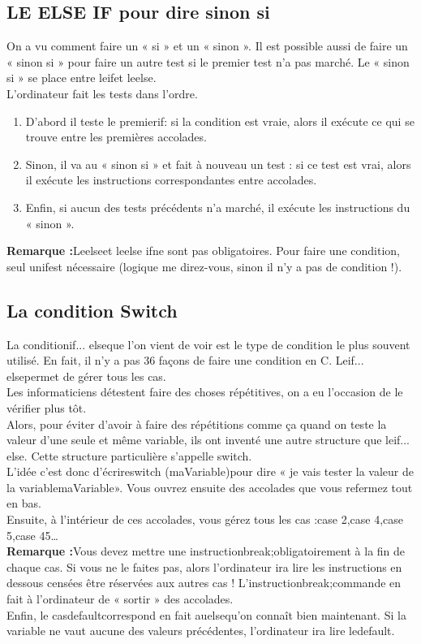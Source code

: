 \subsection{LE ELSE IF pour dire sinon si}
On a vu comment faire un « si » et un « sinon ». Il est possible aussi de faire un « sinon si » pour faire un autre test si le premier test n'a pas marché. Le « sinon si » se place entre leifet leelse.
\\[0.5cm]
L'ordinateur fait les tests dans l'ordre.
\begin{enumerate}
\item D'abord il teste le premierif: si la condition est vraie, alors il exécute ce qui se trouve entre les premières accolades.
\item Sinon, il va au « sinon si » et fait à nouveau un test : si ce test est vrai, alors il exécute les instructions correspondantes entre accolades.
\item Enfin, si aucun des tests précédents n'a marché, il exécute les instructions du « sinon ».
\end{enumerate}
\textbf{Remarque :}Leelseet leelse ifne sont pas obligatoires. Pour faire une condition, seul unifest nécessaire (logique me direz-vous, sinon il n'y a pas de condition !).
\\[0.5cm]



\subsection{La condition Switch}
La conditionif... elseque l'on vient de voir est le type de condition le plus souvent utilisé.
En fait, il n'y a pas 36 façons de faire une condition en C. Leif... elsepermet de gérer tous les cas.
\\[0.5cm]
Les informaticiens détestent faire des choses répétitives, on a eu l'occasion de le vérifier plus tôt.
\\[0.5cm]
Alors, pour éviter d'avoir à faire des répétitions comme ça quand on teste la valeur d'une seule et même variable, ils ont inventé une autre structure que leif... else. Cette structure particulière s'appelle switch.
\\[0.5cm]
L'idée c'est donc d'écrireswitch (maVariable)pour dire « je vais tester la valeur de la variablemaVariable». Vous ouvrez ensuite des accolades que vous refermez tout en bas.
\\[0.5cm]
Ensuite, à l'intérieur de ces accolades, vous gérez tous les cas :case 2,case 4,case 5,case 45…
\\[0.5cm]
\textbf{Remarque :}Vous devez mettre une instructionbreak;obligatoirement à la fin de chaque cas. Si vous ne le faites pas, alors l'ordinateur ira lire les instructions en dessous censées être réservées aux autres cas ! L'instructionbreak;commande en fait à l'ordinateur de « sortir » des accolades.
\\[0.5cm]
Enfin, le casdefaultcorrespond en fait auelsequ'on connaît bien maintenant. Si la variable ne vaut aucune des valeurs précédentes, l'ordinateur ira lire ledefault.










